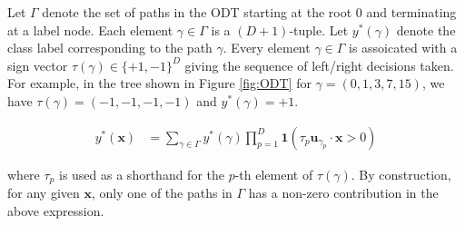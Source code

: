 \documentclass{article}
\theoremstyle{plain}
\theoremstyle{definition}
\theoremstyle{remark}
\newcommand{\1}{{\mathbf 1}}
\newcommand{\0}{{\mathbf 0}}
\newcommand{\x}{{\mathbf x}}
\newcommand{\bu}{{\mathbf u}}
\renewcommand{\>}{{\rightarrow}}
\begin{document}
Let $\Gamma$ denote the set of paths in the ODT starting at the root $0$ and terminating at a label node. Each element $\gamma \in \Gamma$ is a $(D+1)$-tuple. 
Let $y^*(\gamma)$ denote the class label corresponding to the path $\gamma$. Every element $\gamma \in \Gamma$ is assoicated with a sign vector $\tau(\gamma) \in \{+1,-1\}^D$ giving the sequence of left/right decisions taken. For example, in the tree shown in Figure \ref{fig:ODT} for $\gamma=(0,1,3,7,15)$, we have $\tau(\gamma)=(-1,-1,-1,-1)$ and $y^*(\gamma) = +1$.


\begin{equation}
\begin{aligned}
y^*(\x) &= \sum_{\gamma \in \Gamma} y^*(\gamma) \prod_{p = 1}^D \1( \tau_p \bu_{\gamma_p} \cdot \x >0) 
\end{aligned}
\label{eqn:ODT_defn}
\end{equation}

where $\tau_p$ is used as a shorthand for the $p$-th element of $\tau(\gamma)$. By construction, for any given $\x$, only one of the paths in $\Gamma$ has a non-zero contribution in the above expression.

\end{document}
